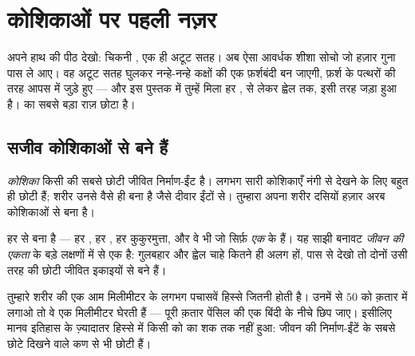 \chapter{कोशिकाओं पर पहली नज़र}\label{ch:g5:first-look-at-cells}

अपने हाथ की पीठ देखो: चिकनी , एक ही अटूट सतह। अब ऐसा आवर्धक शीशा
सोचो जो हज़ार गुना पास ले आए। वह अटूट सतह घुलकर नन्हे-नन्हे कक्षों की
एक फ़र्शबंदी बन जाएगी, फ़र्श के पत्थरों की तरह आपस में जुड़े हुए ---
और इस पुस्तक में तुम्हें मिला हर ,  से लेकर ह्वेल तक, इसी तरह
जड़ा हुआ है।  का सबसे बड़ा राज़ छोटा है।

\section{सजीव कोशिकाओं से बने हैं}

\begin{definition}[कोशिका]\label{def:g5:first-look-at-cells:cell}
\emph{कोशिका} किसी  की सबसे छोटी जीवित निर्माण-ईंट
है। लगभग सारी कोशिकाएँ नंगी  से देखने के लिए बहुत ही छोटी हैं; शरीर
उनसे वैसे ही बना है जैसे दीवार ईंटों से। तुम्हारा अपना शरीर दसियों
हज़ार अरब कोशिकाओं से बना है।
\end{definition}

\begin{proposition}[कोशिका का सिद्धांत]\label{prop:g5:first-look-at-cells:principle}
हर   से बना है --- हर , हर , हर कुकुरमुत्ता, और
वे  भी जो सिर्फ़ \emph{एक}  के हैं। यह साझी बनावट
\emph{जीवन की एकता} के बड़े लक्षणों में से एक है:
गुलबहार और ह्वेल चाहे कितने ही अलग हों, पास से देखो तो दोनों उसी तरह की
छोटी जीवित इकाइयों से बने हैं।
\end{proposition}
\admitted

\begin{example}[छोटा कितना छोटा?]\label{ex:g5:first-look-at-cells:small}
तुम्हारे शरीर की एक आम  मिलीमीटर के लगभग पचासवें हिस्से जितनी
होती है। उनमें से $50$ को क़तार में लगाओ तो वे एक मिलीमीटर घेरती हैं
--- पूरी क़तार पेंसिल की एक बिंदी के नीचे छिप जाए। इसीलिए मानव इतिहास
के ज़्यादातर हिस्से में किसी को  का शक तक नहीं हुआ: जीवन की
निर्माण-ईंटें  के सबसे छोटे दिखने वाले कण से भी छोटी हैं।
\end{example}


